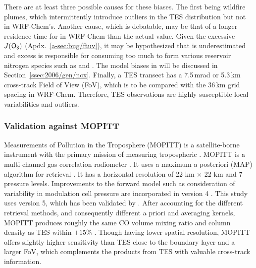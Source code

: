 There are at least three possible causes for these biases. The first being wildfire plumes, which intermittently introduce outliers in the TES distribution but not in WRF-Chem's.
Another cause, which is debatable, may be that of a longer residence time for  in WRF-Chem than the actual value. Given
the excessive $J(\chem{O_3})$ (Apdx.~\ref{a-sec:bug/ftuv}), it may be hypothesized that  is underestimated and excess {\lnox} is responsible for consuming too much
 to form various reservoir nitrogen species such as  and . The model biases in  will be discussed in Section~\ref{ssec:2006/gen/nox}. Finally,
a TES transect has a 7.5\,\unit{mrad} or 5.3\,\unit{km} cross-track Field of View (FoV), which is to be compared with the 36\,\unit{km} grid spacing in WRF-Chem. Therefore, TES
observations are highly susceptible local variabilities and outliers.


\subsubsection{Validation against MOPITT}

Measurements of Pollution in the Troposphere (MOPITT) is a satellite-borne instrument with the primary mission of measuring tropospheric . MOPITT is a
multi-channel gas correlation radiometer \citep{Drummond:1996ve}. It uses a maximum a posteriori (MAP) algorithm for retrieval \citep{Deeter:2003bh}. It has a
horizontal resolution of 22 km $\times$ 22 km and 7 pressure levels. Improvements to the forward model such as consideration of variability in modulation cell pressure
are incorporated in version 4 \citep{Deeter:2010dq}. This study uses version 5, which has been validated by \citet{Deeter:2013fk}. After accounting for the different
retrieval methods, and consequently different a priori and averaging kernels, MOPITT produces roughly the same CO volume mixing ratio and column density as TES
within $\pm15\%$ \citep{Luo:2007ly}. Though having lower spatial resolution, MOPITT offers slightly higher sensitivity than TES close to the boundary layer and a larger
FoV, which complements the  products from TES with valuable cross-track information.


